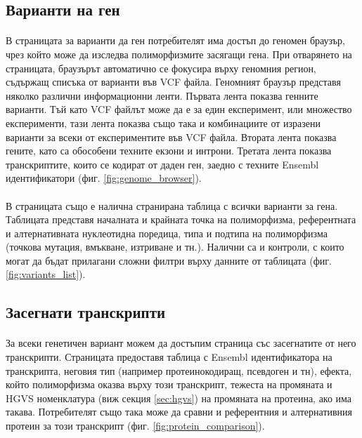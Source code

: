 \documentclass[pdftex,cyrillic,14pt,a4page,twoside,openright]{extreport}
\begin{document}
\subsection{Варианти на ген}
\paragraph{}
В страницата за варианти да ген потребителят има достъп до геномен браузър, чрез който може да изследва полиморфизмите засягащи гена. При отварянето на страницата, браузърът автоматично се фокусира върху геномния регион, съдържащ списъка от варианти във VCF файла. Геномният браузър представя няколко различни информационни ленти. Първата лента показва генните варианти. Тъй като VCF файлът може да е за един експеримент, или множество експерименти, тази лента показва също така и комбинациите от изразени варианти за всеки от експериментите във VCF файла. Втората лента показва гените, като са обособени техните екзони и интрони. Третата лента показва транскриптите, които се кодират от даден ген, заедно с техните Ensembl идентификатори (фиг. \ref{fig:genome_browser}).

\paragraph{}
В страницата също е налична странирана таблица с всички варианти за гена. Таблицата представя началната и крайната точка на полиморфизма, референтната и алтернативната нуклеотидна поредица, типа и подтипа на полиморфизма (точкова мутация, вмъкване, изтриване и тн.). Налични са и контроли, с които могат да бъдат прилагани сложни филтри върху данните от таблицата (фиг. \ref{fig:variants_list}).

\subsection{Засегнати транскрипти}
\paragraph{}
За всеки генетичен вариант можем да достъпим страница със засегнатите от него транскрипти. Страницата предоставя таблица с Ensembl идентификатора на транскрипта, неговия тип (например протеинокодиращ, псевдоген и тн), ефекта, който полиморфизма оказва върху този транскрипт, тежеста на промяната и HGVS номенклатура (виж секция \ref{sec:hgvs}) на промяната на протеина, ако има такава. Потребителят също така може да сравни и референтния и алтернативния протеин за този транскрипт (фиг. \ref{fig:protein_comparison}).
\end{document}
